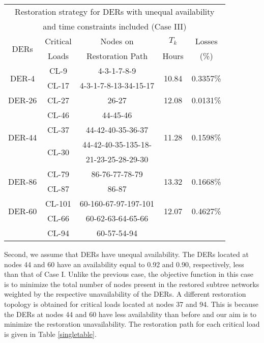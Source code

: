 \documentclass[12pt]{article}
\begin{document}
\begin{table}[t]
\begin{tabular}{c|c|c|c|c}
			\multicolumn{5}{c}{    Restoration strategy for DERs with unequal availability}\\
			\multicolumn{5}{c}{    and time constraints included  (Case III)}\\
			\toprule[0.4 mm]
			\hline
			\multirow{2}{*}{DERs} & Critical & Nodes on & $T_k$& Losses\\
			&Loads&Restoration Path &Hours&(\%)\\
			\hline
			\hline
			\multirow{2}{*}{DER-4}& CL-9& 4-3-1-7-8-9&\multirow{2}{*}{10.84}&\multirow{2}{*}{0.3357\%}\\
			&CL-17&4-3-1-7-8-13-34-15-17& & \\
			\hline
			\multirow{1}{*}{DER-26}& CL-27& 26-27&\multirow{1}{*}{12.08}&\multirow{1}{*}{0.0131\%}\\
			\hline
			\multirow{4}{*}{DER-44}& CL-46& 44-45-46& \multirow{4}{*}{11.28}&\multirow{4}{*}{0.1598\%}\\
			&CL-37&44-42-40-35-36-37& & \\
			&\multirow{2}{*}{ CL-30}&44-42-40-35-135-18-& & \\
			&&21-23-25-28-29-30& & \\
			\hline
			\multirow{2}{*}{DER-86}& CL-79& 86-76-77-78-79& \multirow{2}{*}{13.32}&\multirow{2}{*}{0.1668\%}\\
			&CL-87&86-87& & \\
			\hline
			\multirow{2}{*}{DER-60}& CL-101& 60-160-67-97-197-101&\multirow{2}{*}{12.07}&\multirow{2}{*}{0.4627\%}\\
			&CL-66&60-62-63-64-65-66& & \\
			&CL-94&60-57-54-94& & \\
			\toprule[0.4 mm]
			\hline
		\end{tabular}
	\end{table}
	
		
	
	Second, we assume that DERs have unequal availability. The DERs located at nodes 44 and 60 have an availability equal to 0.92 and 0.90, respectively, less than that of Case I. Unlike the previous case, the objective function in this case is to minimize the total number of nodes present in the restored subtree networks weighted by the respective unavailability of the DERs. A different restoration topology is obtained for critical loads located at nodes 37 and 94. This is because the DERs at nodes 44 and 60 have less availability than before and our aim is to minimize the restoration unavailability. The restoration path for each critical load is given in Table \ref{singletable}.
	
\end{document}
